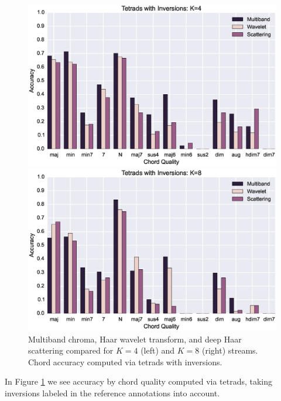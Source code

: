 \documentclass{article}
\begin{document}
\begin{figure}
\centering
\begin{minipage}{\columnwidth}
	\centering
	\includegraphics[width=1.05\columnwidth]{figs/tetrad_inv4.eps}
\end{minipage}
\begin{minipage}{\columnwidth}
	\centering
	\includegraphics[width=1.05\columnwidth]{figs/tetrad_inv8.eps}
\end{minipage}
\caption{Multiband chroma, Haar wavelet transform, and deep Haar scattering compared for $K=4$ (left) and $K=8$ (right) streams. Chord accuracy computed via tetrads with inversions.}
\label{fig:tetrads}
\end{figure}

In Figure \ref{fig:tetrads} we see accuracy by chord quality computed via tetrads, taking inversions labeled in the reference annotations into account. 
\end{document}
